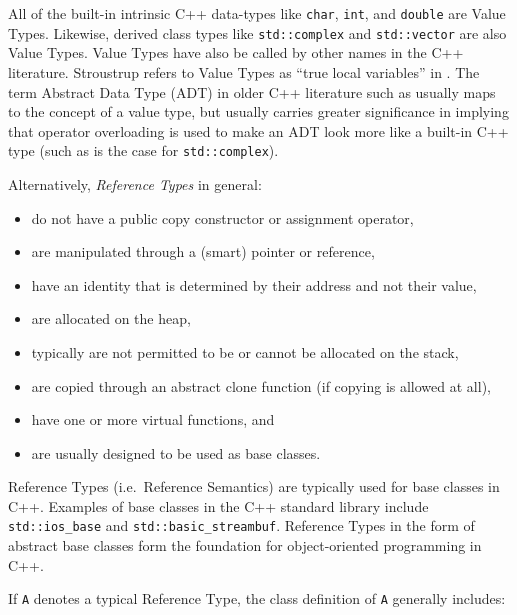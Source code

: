 \documentclass[pdf,ps2pdf,11pt]{SANDreport}
\begin{document}
All of the built-in intrinsic C++ data-types like {}\texttt{char},
{}\texttt{int}, and {}\texttt{double} are Value Types.  Likewise,
derived class types like {}\texttt{std::complex} and
{}\texttt{std::vector} are also Value Types.  Value Types have also be
called by other names in the C++ literature.  Stroustrup refers to
Value Types as ``true local variables'' in {}\cite{stroustrup94}.  The
term Abstract Data Type (ADT) in older C++ literature such as
{}\cite{AdvancedC++92} usually maps to the concept of a value type,
but usually carries greater significance in implying that operator
overloading is used to make an ADT look more like a built-in C++ type
(such as is the case for {}\texttt{std::complex}).

Alternatively, {}\textit{Reference Types} in general:

\begin{itemize}

{}\item do not have a public copy constructor or assignment operator,

{}\item are manipulated through a (smart) pointer or reference,

{}\item have an identity that is determined by their address and not
their value,

{}\item are allocated on the heap,

{}\item typically are not permitted to be or cannot be allocated on
the stack,

{}\item are copied through an abstract clone function (if copying is
allowed at all),

{}\item have one or more virtual functions, and

{}\item are usually designed to be used as base classes.

\end{itemize}

Reference Types (i.e.\ Reference Semantics) are typically used for base
classes in C++.  Examples of base classes in the C++ standard library
include {}\texttt{std::ios\_base} and
{}\texttt{std::basic\_streambuf}.  Reference Types in the form of
abstract base classes form the foundation for object-oriented
programming in C++.

If {}\texttt{A} denotes a typical Reference Type, the class definition
of {}\texttt{A} generally includes:
\end{document}
